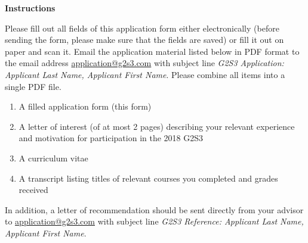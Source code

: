 \documentclass[11pt]{article}
\begin{document}
\begin{center}
\large  
\textbf{Instructions}
\end{center}
\noindent
Please fill out all fields of this application form either
electronically (before sending the form, please make sure that the
fields are saved) or fill it out on paper and scan it.
Email the application material listed below in PDF format to the email address
\href{mailto:application@g2s3.com}{application@g2s3.com} with
subject line \textsl{G2S3 Application: Applicant Last Name, Applicant
  First Name}. Please combine all items into a single PDF file.\\[1ex]
%
\begin{enumerate}
\item A filled application form (this form)\hspace{-1ex}
\item A letter of interest (of at most 2 pages) describing your
  relevant experience and motivation for participation in the 2018
  G2S3 \hspace{-1ex} 
\item A curriculum vitae \hspace{-1ex}
\item A transcript listing titles of relevant courses you completed
  and grades received 
\end{enumerate}
\noindent{}In addition, a letter of recommendation should be sent directly from your advisor to \href{mailto:application@g2s3.com}{application@g2s3.com} with subject line \textsl{G2S3 Reference: Applicant Last Name, Applicant First Name}.\\

\\
\pagestyle{empty}
\end{document}
